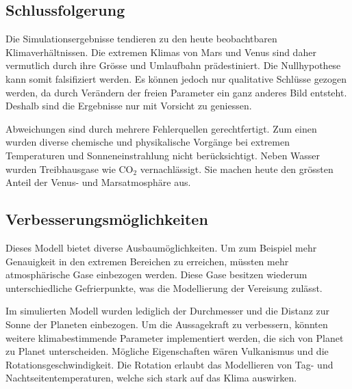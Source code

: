 \begin{refsection}
\section{Schlussfolgerung}

Die Simulationsergebnisse tendieren zu den heute beobachtbaren Klimaverhältnissen. Die extremen Klimas von Mars und Venus sind daher vermutlich durch ihre Grösse und Umlaufbahn prädestiniert. Die Nullhypothese kann somit falsifiziert werden. Es können jedoch nur qualitative Schlüsse gezogen werden, da durch Verändern der freien Parameter ein ganz anderes Bild entsteht. Deshalb sind die Ergebnisse nur mit Vorsicht zu geniessen.

Abweichungen sind durch mehrere Fehlerquellen gerechtfertigt. Zum einen wurden diverse chemische und physikalische Vorgänge bei extremen Temperaturen und Sonneneinstrahlung nicht berücksichtigt.
Neben Wasser wurden Treibhausgase wie CO$_2$ vernachlässigt. Sie machen heute den grössten Anteil der Venus- und Marsatmosphäre aus.

\subsection{Verbesserungsmöglichkeiten}

Dieses Modell bietet diverse Ausbaumöglichkeiten. Um zum Beispiel mehr Genauigkeit in den extremen Bereichen zu erreichen, müssten mehr atmosphärische Gase einbezogen werden.
Diese Gase besitzen wiederum unterschiedliche Gefrierpunkte, was die Modellierung der Vereisung zulässt.
		
Im simulierten Modell wurden lediglich der Durchmesser und die Distanz zur Sonne der Planeten einbezogen. Um die Aussagekraft zu verbessern, könnten weitere klimabestimmende Parameter implementiert werden, die sich von Planet zu Planet unterscheiden. Mögliche Eigenschaften wären Vulkanismus und die Rotationsgeschwindigkeit. Die Rotation erlaubt das Modellieren von Tag- und Nachtseitentemperaturen, welche sich stark auf das Klima auswirken.

\printbibliography[heading=subbibliography]
\end{refsection}
